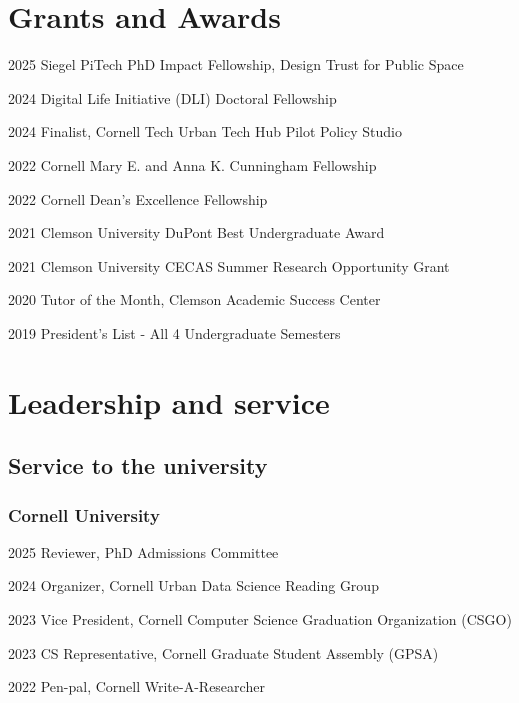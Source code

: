 \documentclass[10pt,letterpaper]{report}
\begin{document}
    \section*{Grants and Awards}
    

    \begin{tablist}
        \item[2025] \tab{}Siegel PiTech PhD Impact Fellowship, Design Trust for Public Space
        \item[2024] \tab{}Digital Life Initiative (DLI) Doctoral Fellowship 
        \item[2024] \tab{}Finalist, Cornell Tech Urban Tech Hub Pilot Policy Studio 
        \item[2022] \tab{}Cornell Mary E. and Anna K. Cunningham Fellowship 
        \item[2022] \tab{}Cornell Dean's Excellence Fellowship 
        \item[2021] \tab{}Clemson University DuPont Best Undergraduate Award  
        \item[2021] \tab{}Clemson University CECAS Summer Research Opportunity Grant 
        \item[2020] \tab{}Tutor of the Month, Clemson Academic Success Center 
        \item[2019] \tab{}President's List - All 4 Undergraduate Semesters

    \end{tablist}

    \section*{Leadership and service}
    \subsection*{Service to the university}
    \subsubsection{Cornell University}
    \begin{tablist}
        \item[2025] Reviewer, PhD Admissions Committee
        \item[2024] Organizer, Cornell Urban Data Science Reading Group 
        \item[2023] Vice President, Cornell Computer Science Graduation Organization (CSGO)
        \item[2023] CS Representative, Cornell Graduate Student Assembly (GPSA)
        \item[2022] Pen-pal, Cornell Write-A-Researcher
    \end{tablist}
        
\end{document}
